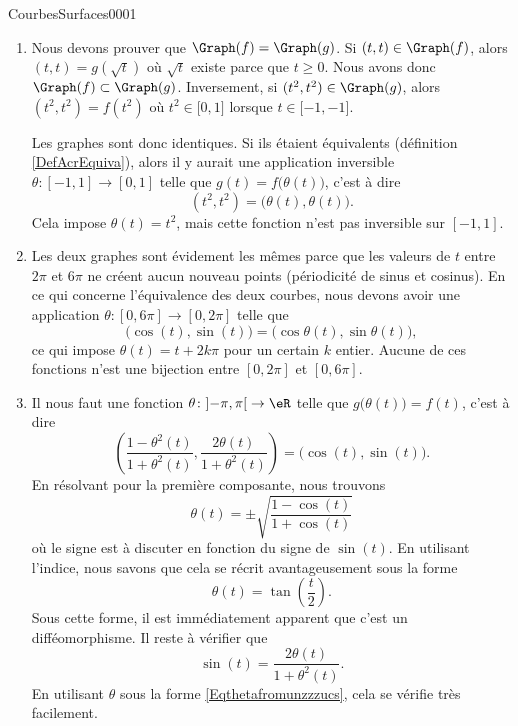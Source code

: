 \begin{corrige}{CourbesSurfaces0001}

	\begin{enumerate}
		\item
			Nous devons prouver que $\Graph(f)=\Graph(g)$. Si $(t,t)\in \Graph(f)$, alors $(t,t)=g(\sqrt{t})$ où $\sqrt{t}$ existe parce que $t\geq 0$. Nous avons donc $\Graph(f)\subset\Graph(g)$. Inversement, si $(t^2,t^2)\in\Graph(g)$, alors $(t^2,t^2)=f(t^2)$ où $t^2\in\mathopen[ 0 , 1 \mathclose]$ lorsque $t\in\mathopen[ -1 , -1 \mathclose]$.

			Les graphes sont donc identiques. Si ils étaient équivalents (définition \ref{DefAcrEquiva}), alors il y aurait une application inversible $\theta\colon [-1,1]\to [0,1]$ telle que $g(t)=f\big( \theta(t) \big)$, c'est à dire
			\begin{equation}
				(t^2,t^2)=\big( \theta(t),\theta(t) \big).
			\end{equation}
			Cela impose $\theta(t)=t^2$, mais cette fonction n'est pas inversible sur $[-1,1]$.

		\item
			Les deux graphes sont évidement les mêmes parce que les valeurs de $t$ entre $2\pi$ et $6\pi$ ne créent aucun nouveau points (périodicité de sinus et cosinus). En ce qui concerne l'équivalence des deux courbes, nous devons avoir une application $\theta\colon [0,6\pi]\to [0,2\pi]$ telle que
			\begin{equation}
				\big( \cos(t),\sin(t) \big)=\big( \cos\theta(t),\sin\theta(t) \big),
			\end{equation}
			ce qui impose $\theta(t)=t+2k\pi$ pour un certain $k$ entier. Aucune de ces fonctions n'est une bijection entre $[0,2\pi]$ et $[0,6\pi]$.
		\item
			Il nous faut une fonction $\theta\colon \mathopen] -\pi , \pi \mathclose[\to \eR$ telle que $g\big( \theta(t) \big)=f(t)$, c'est à dire
			\begin{equation}
				\left( \frac{ 1-\theta^2(t) }{ 1+\theta^2(t) },\frac{ 2\theta(t) }{ 1+\theta^2(t) } \right)=\big( \cos(t),\sin(t) \big).
			\end{equation}
			En résolvant pour la première composante, nous trouvons
            \begin{equation}        \label{Eqthetafromunzzzucs}
				\theta(t)=\pm\sqrt{\frac{ 1-\cos(t) }{ 1+\cos(t) }}
			\end{equation}
            où le signe est à discuter en fonction du signe de \( \sin(t)\). En utilisant l'indice, nous savons que cela se récrit avantageusement sous la forme
            \begin{equation}
                \theta(t)=\tan\left( \frac{ t }{2} \right).
            \end{equation}
            Sous cette forme, il est immédiatement apparent que c'est un difféomorphisme. Il reste à vérifier que
            \begin{equation}
                \sin(t)=\frac{ 2\theta(t) }{ 1+\theta^2(t) }.
            \end{equation}
            En utilisant \( \theta\) sous la forme \eqref{Eqthetafromunzzzucs}, cela se vérifie très facilement.


\end{enumerate}
\end{corrige}
